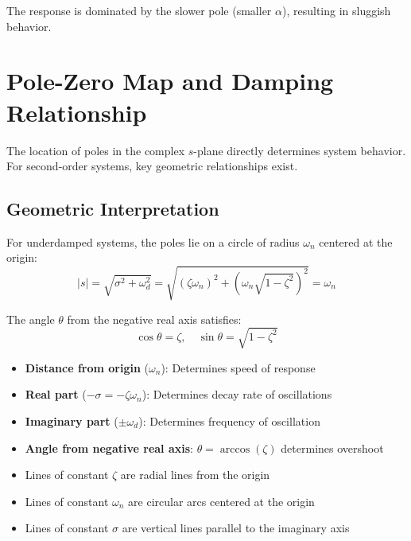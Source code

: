 The response is dominated by the slower pole (smaller $\alpha$), resulting in sluggish behavior.

\section{Pole-Zero Map and Damping Relationship}
\label{sec:pz_damping}

The location of poles in the complex $s$-plane directly determines system behavior. For second-order systems, key geometric relationships exist.

\subsection{Geometric Interpretation}

For underdamped systems, the poles lie on a circle of radius $\omega_n$ centered at the origin:
\begin{equation}
|s| = \sqrt{\sigma^2 + \omega_d^2} = \sqrt{(\zeta\omega_n)^2 + (\omega_n\sqrt{1-\zeta^2})^2} = \omega_n
\end{equation}

The angle $\theta$ from the negative real axis satisfies:
\begin{equation}
\cos\theta = \zeta, \quad \sin\theta = \sqrt{1 - \zeta^2}
\end{equation}

\begin{keyconceptbox}[title=Pole Location and System Behavior]
\begin{itemize}
    \item \textbf{Distance from origin} ($\omega_n$): Determines speed of response
    \item \textbf{Real part} ($-\sigma = -\zeta\omega_n$): Determines decay rate of oscillations
    \item \textbf{Imaginary part} ($\pm\omega_d$): Determines frequency of oscillation
    \item \textbf{Angle from negative real axis}: $\theta = \arccos(\zeta)$ determines overshoot
    \item Lines of constant $\zeta$ are radial lines from the origin
    \item Lines of constant $\omega_n$ are circular arcs centered at the origin
    \item Lines of constant $\sigma$ are vertical lines parallel to the imaginary axis
\end{itemize}
\end{keyconceptbox}

